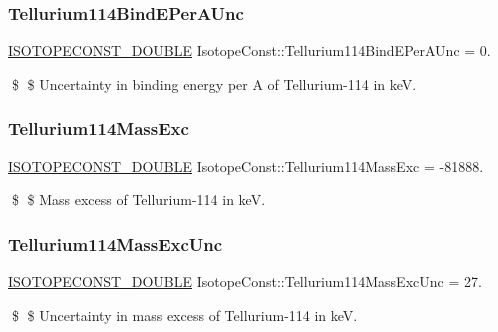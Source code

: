 \subsubsection{\texorpdfstring{Tellurium114\+Bind\+E\+Per\+A\+Unc}{Tellurium114BindEPerAUnc}}
{\footnotesize\ttfamily \mbox{\hyperlink{group___isotope_const-_macros_ga8f45a7272ce02c0b4c65c44636ed719a}{I\+S\+O\+T\+O\+P\+E\+C\+O\+N\+S\+T\+\_\+\+D\+O\+U\+B\+LE}} Isotope\+Const\+::\+Tellurium114\+Bind\+E\+Per\+A\+Unc = 0.}

\$ \$ Uncertainty in binding energy per A of Tellurium-\/114 in keV. \mbox{\label{group___isotope_const-_tellurium-_te114_ga8f348e810c2b635dd01e22b663a6a925}} 
\subsubsection{\texorpdfstring{Tellurium114\+Mass\+Exc}{Tellurium114MassExc}}
{\footnotesize\ttfamily \mbox{\hyperlink{group___isotope_const-_macros_ga8f45a7272ce02c0b4c65c44636ed719a}{I\+S\+O\+T\+O\+P\+E\+C\+O\+N\+S\+T\+\_\+\+D\+O\+U\+B\+LE}} Isotope\+Const\+::\+Tellurium114\+Mass\+Exc = -\/81888.}

\$ \$ Mass excess of Tellurium-\/114 in keV. \mbox{\label{group___isotope_const-_tellurium-_te114_ga57b9ae62ec4e04c8a4d64ebc9e7ab36a}} 
\subsubsection{\texorpdfstring{Tellurium114\+Mass\+Exc\+Unc}{Tellurium114MassExcUnc}}
{\footnotesize\ttfamily \mbox{\hyperlink{group___isotope_const-_macros_ga8f45a7272ce02c0b4c65c44636ed719a}{I\+S\+O\+T\+O\+P\+E\+C\+O\+N\+S\+T\+\_\+\+D\+O\+U\+B\+LE}} Isotope\+Const\+::\+Tellurium114\+Mass\+Exc\+Unc = 27.}

\$ \$ Uncertainty in mass excess of Tellurium-\/114 in keV. \mbox{\label{group___isotope_const-_tellurium-_te114_ga892b02227522be62a6609e079f1acc87}} 

